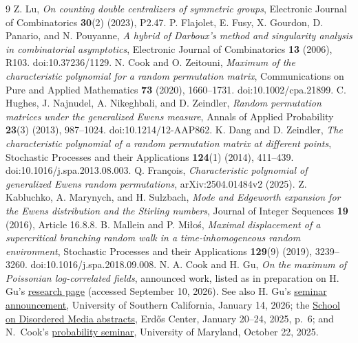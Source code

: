 \documentclass[11pt]{article}
\theoremstyle{definition}\newtheorem{definition}[theorem]{Definition}
\theoremstyle{remark}\newtheorem{remark}[theorem]{Remark}
\numberwithin{equation}{section}\allowdisplaybreaks
\begin{document}
\begin{thebibliography}{9}
Z. Lu, \emph{On counting double centralizers of symmetric groups},
Electronic Journal of Combinatorics \textbf{30}(2) (2023), P2.47.
P. Flajolet, E. Fusy, X. Gourdon, D. Panario, and N. Pouyanne,
\emph{A hybrid of Darboux's method and singularity analysis in
combinatorial asymptotics}, Electronic Journal of Combinatorics
\textbf{13} (2006), R103. doi:10.37236/1129.
N. Cook and O. Zeitouni, \emph{Maximum of the characteristic polynomial
for a random permutation matrix}, Communications on Pure and Applied
Mathematics \textbf{73} (2020), 1660--1731. doi:10.1002/cpa.21899.
C. Hughes, J. Najnudel, A. Nikeghbali, and D. Zeindler,
\emph{Random permutation matrices under the generalized Ewens measure},
Annals of Applied Probability \textbf{23}(3) (2013), 987--1024.
doi:10.1214/12-AAP862.
K. Dang and D. Zeindler, \emph{The characteristic polynomial of a random
permutation matrix at different points}, Stochastic Processes and their
Applications \textbf{124}(1) (2014), 411--439.
doi:10.1016/j.spa.2013.08.003.
Q. Fran\c{c}ois, \emph{Characteristic polynomial of generalized Ewens
random permutations}, arXiv:2504.01484v2 (2025).
Z. Kabluchko, A. Marynych, and H. Sulzbach,
\emph{Mode and Edgeworth expansion for the Ewens distribution and the
Stirling numbers}, Journal of Integer Sequences \textbf{19} (2016),
Article 16.8.8.
B. Mallein and P. Mi\l o\'s, \emph{Maximal displacement of a supercritical
branching random walk in a time-inhomogeneous random environment},
Stochastic Processes and their Applications \textbf{129}(9) (2019),
3239--3260. doi:10.1016/j.spa.2018.09.008.
N. A. Cook and H. Gu, \emph{On the maximum of Poissonian log-correlated
fields}, announced work, listed as in preparation on H. Gu's
\href{https://sites.google.com/view/haotian-gu/research}{research page}
(accessed September 10, 2026). See also H. Gu's
\href{https://calendar.usc.edu/event/probability-and-statistics-seminar-maximum-of-poissonian-log-correlated-fields}{seminar announcement},
University of Southern California, January 14, 2026; the
\href{https://erdoscenter.renyi.hu/sites/default/files/events/documents/short_talk_book_of_abstracts.pdf}{School on Disordered Media abstracts},
Erd\H{o}s Center, January 20--24, 2025, p.~6; and N.~Cook's
\href{https://www-math.umd.edu/gcal_rss.php?html=\&seminar_key=PROB\&year=2026}{probability seminar},
University of Maryland, October 22, 2025.
\end{thebibliography}
\end{document}
